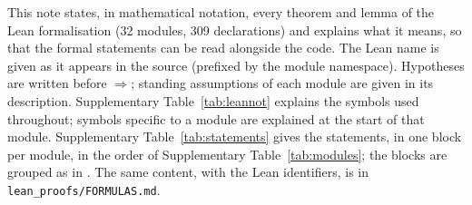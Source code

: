 \sloppy

This note states, in mathematical notation, every theorem and lemma of the Lean formalisation (32 modules, 309 declarations) and explains what it means, so that the formal statements can be read alongside the code. The Lean name is given as it appears in the source (prefixed by the module namespace). Hypotheses are written before $\Rightarrow$; standing assumptions of each module are given in its description. Supplementary Table~\ref{tab:leannot} explains the symbols used throughout; symbols specific to a module are explained at the start of that module. Supplementary Table~\ref{tab:statements} gives the statements, in one block per module, in the order of Supplementary Table~\ref{tab:modules}; the blocks are grouped as in . The same content, with the Lean identifiers, is in \texttt{lean\_proofs/FORMULAS.md}.

